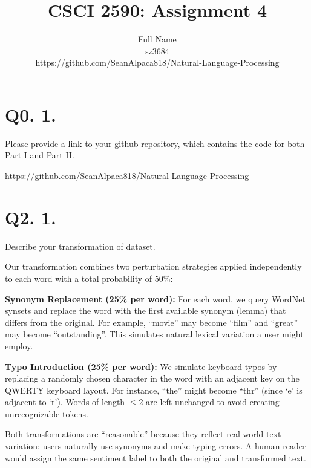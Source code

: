 \documentclass{article}
\title{CSCI 2590: Assignment 4}
\author{Full Name \\ sz3684 \\ \url{https://github.com/SeanAlpaca818/Natural-Language-Processing}}
\date{}
\begin{document}
\maketitle
\section*{Q0. 1.}
Please provide a link to your github repository, which contains the code for both Part I and Part II.

\url{https://github.com/SeanAlpaca818/Natural-Language-Processing}

\section*{Q2. 1.}
Describe your transformation of dataset.

Our transformation combines two perturbation strategies applied independently to each word with a total probability of 50\%:

\textbf{Synonym Replacement (25\% per word):} For each word, we query WordNet synsets and replace the word with the first available synonym (lemma) that differs from the original. For example, ``movie'' may become ``film'' and ``great'' may become ``outstanding''. This simulates natural lexical variation a user might employ.

\textbf{Typo Introduction (25\% per word):} We simulate keyboard typos by replacing a randomly chosen character in the word with an adjacent key on the QWERTY keyboard layout. For instance, ``the'' might become ``thr'' (since `e' is adjacent to `r'). Words of length $\leq 2$ are left unchanged to avoid creating unrecognizable tokens.

Both transformations are ``reasonable'' because they reflect real-world text variation: users naturally use synonyms and make typing errors. A human reader would assign the same sentiment label to both the original and transformed text.

\end{document}

